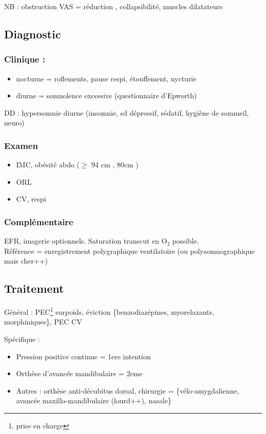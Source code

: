 NB : obstruction VAS = réduction \diameter, \nearrow{} collapsibilité,
\searrow{} muscles dilatateurs
\subsection{Diagnostic}
\subsubsection{Clinique :}
\begin{itemize}
  \item nocturne = roflements, pause respi, étouffement, nycturie
  \item diurne = somnolence excessive (questionnaire d'Epworth)
\end{itemize}
DD : hypersomnie diurne (insomnie, sd dépressif, sédatif, hygiène de sommeil,
neuro)
\subsubsection{Examen}
\begin{itemize}
  \item IMC, obésité abdo (\(\ge\) 94 cm \male, 80cm \female)
  \item ORL
  \item CV, respi
\end{itemize}
\subsubsection{Complémentaire}
EFR, imagerie optionnels.
Saturation transcut en O\(_{\text{2}}\) possible.\\
Référence = enregistrement polygraphique ventilatoire (ou polysomnographique
mais cher++)
\subsection{Traitement}
Général : PEC\footnote{prise en charge} surpoids, éviction \{benzodiazépines,
myorelaxants, morphiniques\}, PEC CV

Spécifique :
\begin{itemize}
  \item Pression positive continue = 1ere intention
  \item Orthèse d'avancée mandibulaire = 2eme
  \item Autres : orthèse anti-décubitus dorsal, chirurgie = \{vélo-amygdalienne,
    avancée maxillo-mandibulaire (lourd++), nasale\}
\end{itemize}
